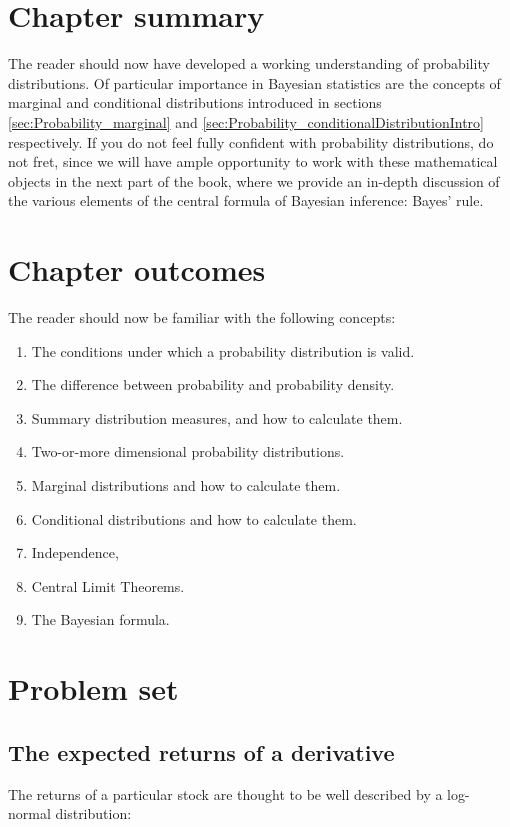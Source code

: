 \documentclass[11pt,fullpage]{book}
\begin{document}
\section{Chapter summary}
The reader should now have developed a working understanding of probability distributions. Of particular importance in Bayesian statistics are the concepts of marginal and conditional distributions introduced in sections \ref{sec:Probability_marginal} and \ref{sec:Probability_conditionalDistributionIntro} respectively. If you do not feel fully confident with probability distributions, do not fret, since we will have ample opportunity to work with these mathematical objects in the next part of the book, where we provide an in-depth discussion of the various elements of the central formula of Bayesian inference: Bayes' rule.

\section{Chapter outcomes}
The reader should now be familiar with the following concepts:
\begin{enumerate}
\item The conditions under which a probability distribution is valid.
\item The difference between probability and probability density.
\item Summary distribution measures, and how to calculate them.
\item Two-or-more dimensional probability distributions.
\item Marginal distributions and how to calculate them.
\item Conditional distributions and how to calculate them.
\item Independence,
\item Central Limit Theorems.
\item The Bayesian formula.
\end{enumerate}

\section{Problem set}
\subsection{The expected returns of a derivative}
The returns of a particular stock are thought to be well described by a log-normal distribution:
\end{document}
